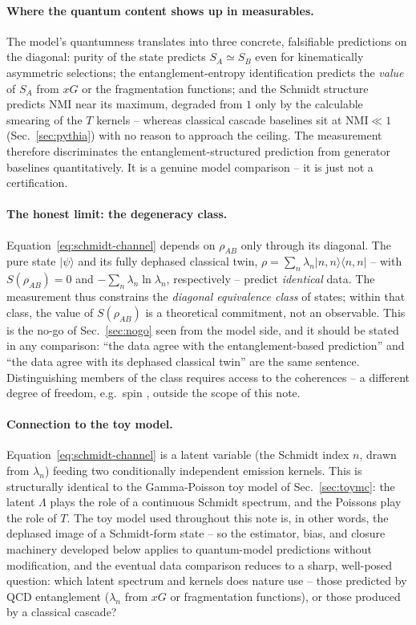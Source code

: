 \documentclass[11pt]{article}
\newcommand{\NMI}{\mathrm{NMI}}
\begin{document}
\paragraph{Where the quantum content shows up in measurables.} The
model's quantumness translates into three concrete, falsifiable
predictions on the diagonal: purity of the state predicts
$S_A\simeq S_B$ even for kinematically asymmetric selections; the
entanglement-entropy identification predicts the \emph{value} of $S_A$
from $xG$ or the fragmentation functions; and the Schmidt structure
predicts $\NMI$ near its maximum, degraded from $1$ only by the
calculable smearing of the $T$ kernels -- whereas classical cascade
baselines sit at $\NMI\ll1$ (Sec.~\ref{sec:pythia}) with no reason to
approach the ceiling. The measurement therefore discriminates the
entanglement-structured prediction from generator baselines
quantitatively. It is a genuine model comparison -- it is just not a
certification.

\paragraph{The honest limit: the degeneracy class.}
Equation~\eqref{eq:schmidt-channel} depends on $\rho_{AB}$ only through
its diagonal. The pure state $|\psi\rangle$ and its fully dephased
classical twin, $\rho=\sum_n\lambda_n|n,n\rangle\langle n,n|$ -- with
$S(\rho_{AB})=0$ and $-\sum_n\lambda_n\ln\lambda_n$, respectively --
predict \emph{identical} data. The measurement thus constrains the
\emph{diagonal equivalence class} of states; within that class, the
value of $S(\rho_{AB})$ is a theoretical commitment, not an observable.
This is the no-go of Sec.~\ref{sec:nogo} seen from the model side, and
it should be stated in any comparison: ``the data agree with the
entanglement-based prediction'' and ``the data agree with its dephased
classical twin'' are the same sentence. Distinguishing members of the
class requires access to the coherences -- a different degree of
freedom, e.g.\ spin \cite{GPTV2022,AfikDeNova2023}, outside the scope of
this note.

\paragraph{Connection to the toy model.}
Equation~\eqref{eq:schmidt-channel} is a latent variable (the Schmidt
index $n$, drawn from $\lambda_n$) feeding two conditionally independent
emission kernels. This is structurally identical to the Gamma-Poisson
toy model of Sec.~\ref{sec:toymc}: the latent $\Lambda$ plays the role
of a continuous Schmidt spectrum, and the Poissons play the role of $T$.
The toy model used throughout this note is, in other words, the dephased
image of a Schmidt-form state -- so the estimator, bias, and closure
machinery developed below applies to quantum-model predictions without
modification, and the eventual data comparison reduces to a sharp,
well-posed question: which latent spectrum and kernels does nature use
-- those predicted by QCD entanglement ($\lambda_n$ from $xG$ or
fragmentation functions), or those produced by a classical cascade?
\end{document}
